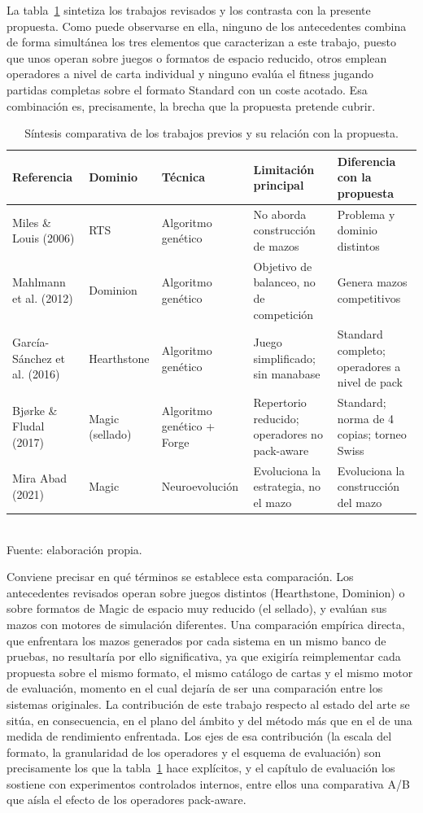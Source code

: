 La tabla~\ref{tab:comparativa} sintetiza los trabajos revisados y los contrasta con la presente propuesta. Como puede observarse en ella, ninguno de los antecedentes combina de forma simultánea los tres elementos que caracterizan a este trabajo, puesto que unos operan sobre juegos o formatos de espacio reducido, otros emplean operadores a nivel de carta individual y ninguno evalúa el fitness jugando partidas completas sobre el formato Standard con un coste acotado. Esa combinación es, precisamente, la brecha que la propuesta pretende cubrir.

\begin{table}[H]
\centering
\caption{Síntesis comparativa de los trabajos previos y su relación con la propuesta.}
\label{tab:comparativa}
\small
\begin{tabular}{p{2.3cm}p{1.7cm}p{2.2cm}p{3.0cm}p{3.0cm}}
\toprule
\textbf{Referencia} & \textbf{Dominio} & \textbf{Técnica} & \textbf{Limitación principal} & \textbf{Diferencia con la propuesta} \\
\midrule
Miles \& Louis (2006) & RTS & Algoritmo genético & No aborda construcción de mazos & Problema y dominio distintos \\
Mahlmann et al. (2012) & Dominion & Algoritmo genético & Objetivo de balanceo, no de competición & Genera mazos competitivos \\
García-Sánchez et al. (2016) & Hearthstone & Algoritmo genético & Juego simplificado; sin manabase & Standard completo; operadores a nivel de pack \\
Bjørke \& Fludal (2017) & Magic (sellado) & Algoritmo genético + Forge & Repertorio reducido; operadores no pack-aware & Standard; norma de 4 copias; torneo Swiss \\
Mira Abad (2021) & Magic & Neuroevolución & Evoluciona la estrategia, no el mazo & Evoluciona la construcción del mazo \\
\bottomrule
\end{tabular}\\[2pt]
{\footnotesize Fuente: elaboración propia.}
\end{table}

Conviene precisar en qué términos se establece esta comparación. Los antecedentes revisados operan sobre juegos distintos (Hearthstone, Dominion) o sobre formatos de Magic de espacio muy reducido (el sellado), y evalúan sus mazos con motores de simulación diferentes. Una comparación empírica directa, que enfrentara los mazos generados por cada sistema en un mismo banco de pruebas, no resultaría por ello significativa, ya que exigiría reimplementar cada propuesta sobre el mismo formato, el mismo catálogo de cartas y el mismo motor de evaluación, momento en el cual dejaría de ser una comparación entre los sistemas originales. La contribución de este trabajo respecto al estado del arte se sitúa, en consecuencia, en el plano del ámbito y del método más que en el de una medida de rendimiento enfrentada. Los ejes de esa contribución (la escala del formato, la granularidad de los operadores y el esquema de evaluación) son precisamente los que la tabla~\ref{tab:comparativa} hace explícitos, y el capítulo de evaluación los sostiene con experimentos controlados internos, entre ellos una comparativa A/B que aísla el efecto de los operadores pack-aware.


